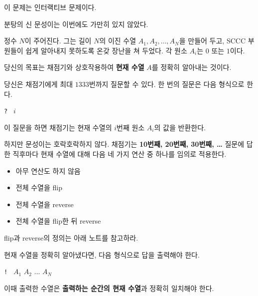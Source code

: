 이 문제는 인터랙티브 문제이다.

분탕의 신 문성이는 이번에도 가만히 있지 않았다.

정수 $N$이 주어진다.
그는 길이 $N$의 이진 수열 $A_1, A_2, \dots, A_N$을 만들어 두고, SCCC 부원들이 쉽게 알아내지 못하도록 온갖 장난을 쳐 두었다.
각 원소 $A_i$는 $0$ 또는 $1$이다.

당신의 목표는 채점기와 상호작용하여 \textbf{현재 수열} $A$를 정확히 알아내는 것이다.

당신은 채점기에게 최대 $1333$번까지 질문할 수 있다.
한 번의 질문은 다음 형식으로 한다.
\begin{center}
\texttt{? } $i$
\end{center}

이 질문을 하면 채점기는 현재 수열의 $i$번째 원소 $A_i$의 값을 반환한다.

하지만 문성이는 호락호락하지 않다.
채점기는 \textbf{10번째, 20번째, 30번째, \dots} 질문에 답한 직후마다 현재 수열에 대해 다음 네 가지 연산 중 하나를 임의로 적용한다.
\begin{itemize}
    \item 아무 연산도 하지 않음
    \item 전체 수열을 flip
    \item 전체 수열을 reverse
    \item 전체 수열을 flip한 뒤 reverse
\end{itemize}

flip과 reverse의 정의는 아래 노트를 참고하라.

현재 수열을 정확히 알아냈다면, 다음 형식으로 답을 출력해야 한다.
\begin{center}
\texttt{! } $A_1$ $A_2$ $\dots$ $A_N$
\end{center}

이때 출력한 수열은 \textbf{출력하는 순간의 현재 수열}과 정확히 일치해야 한다.